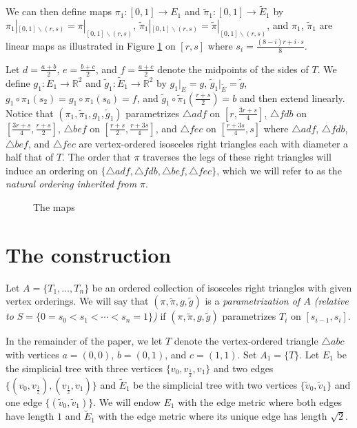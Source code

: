 \documentclass[11pt, leqno]{amsart}
\theoremstyle{definition}\newtheorem{definition}[theorem]{Definition}
\begin{document}
We can then define maps $\pi_1: [0,1]\to E_1$ and $\tilde \pi_1: [0,1]\to \tilde E_1$ by $\pi_1|_{[0,1]\backslash (r,s)} = \pi|_{[0,1]\backslash (r,s)}$, $\tilde \pi_1|_{[0,1]\backslash (r,s)} = \tilde \pi|_{[0,1]\backslash (r,s)}$,  and $\pi_1$, $\tilde \pi_1$ are linear maps as illustrated in Figure \ref{fig:inductive step} on $[r,s]$ where $s_i = \frac{(8-i)r + i\cdot s}{8}$.

Let $d=\frac{a+b}{2}$, $e=\frac{b+c}{2}$, and $f=\frac{a+c}{2}$ denote the midpoints of the sides of $T$. We define $g_1: E_1 \to \mathbb{R}^2$ and $\tilde g_1: \tilde E_1 \to \mathbb{R}^2$ by $g_1|_{E} = g$, $\tilde g_1|_{\tilde E} = \tilde g$, $g_1\circ \pi_1(s_2)=g_1\circ \pi_1(s_6) =f $, and $\tilde g_1\circ \tilde \pi_1(\frac{r+s}{2})= b$ and then extend linearly. Notice that $(\pi_1,\tilde \pi_1, g_1,\tilde g_1)$ parametrizes $\triangle adf$ on $[r,\frac{3r+s}{4}]$, $\triangle fdb $ on $[\frac{3r+s}{4},\frac{r+s}{2}]$, $\triangle bef$ on $[\frac{r+s}{2},\frac{r+3s}{4}]$, and $\triangle fec$ on $[\frac{r+3s}{4},s]$ where $\triangle adf$, $\triangle fdb$, $\triangle bef$, and $\triangle fec$ are vertex-ordered isosceles right triangles each with diameter a half that of $T$. The order that $\pi$ traverses the legs of these right triangles will induce an ordering on $\{\triangle adf,\triangle fdb,  \triangle bef, \triangle fec\}$, which we will refer to as the \textit{natural ordering inherited from} $\pi$.


\begin{figure}[ht]
    \centering
        {\tiny\def\svgwidth{\textwidth}}
    \caption{The maps}
    \label{fig:inductive step}
\end{figure}

\section{The construction}\label{sec: construction}
Let $A =\{T_1, \dots, T_n\}$ be an ordered collection of isosceles right triangles with given vertex orderings.  We will say that $(\pi, \tilde \pi, g, \tilde g) $ is a \emph{parametrization of $A$ (relative to $S=\{0=s_0< s_1< \cdots< s_n=1\}$)} if  $(\pi, \tilde \pi, g, \tilde g) $ parametrizes $T_i$ on $[s_{i-1},s_i]$.

In the remainder of the paper, we let $T$ denote the vertex-ordered triangle $\triangle abc$ with vertices $a=(0,0)$, $b=(0,1)$, and $c=(1,1)$. Set $A_1=\{T\}$. Let $E_1$ be the simplicial tree with three vertices $\{v_0, v_\frac12, v_1\}$ and two edges $\big\{(v_0, v_\frac12), (v_\frac12, v_1)\bigr\}$ and $\tilde E_1$ be the simplicial tree with two vertices $\{\tilde v_0, \tilde v_1\}$ and one edge $\big\{(\tilde v_0, \tilde v_1)\bigr\}$. We will endow $E_1$ with the edge metric where both edges have length $1$ and $\tilde E_1$ with the edge metric where its unique edge has length $\sqrt{2}$.
\end{document}
